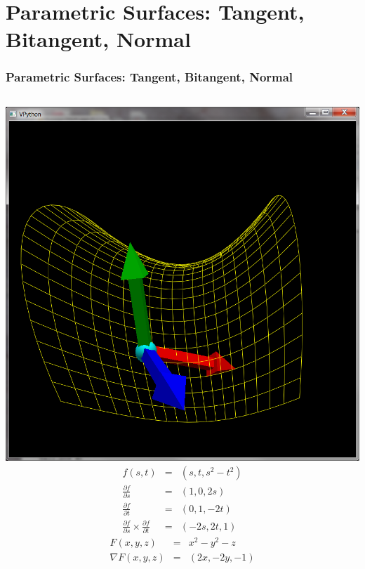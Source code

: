 \documentclass[slidestop,xcolor=pst]{beamer}
\newcommand{\sect}[1]{
\section{#1}
\begin{frame}[fragile]\frametitle{#1}
}
\begin{document}
\sect{Parametric Surfaces: Tangent, Bitangent, Normal}
\begin{columns}[c]
\includegraphics[width=\textwidth]{images/vpythonpsurface.png}
\begin{eqnarray*}
f(s,t) &=& (s, t, s^2-t^2)\\
\frac{\partial f}{\partial s} &=& (1, 0, 2s)\\
\frac{\partial f}{\partial t} &=& (0, 1, -2t)\\
\frac{\partial f}{\partial s} \times
\frac{\partial f}{\partial t} &=& (-2s, 2t, 1)
\end{eqnarray*}
\begin{eqnarray*}
F(x,y,z) &=& x^2 - y^2 - z\\
\nabla F(x,y,z) &=& (2x, -2y, -1)
\end{eqnarray*}
\end{columns}
\end{frame}
\end{document}
